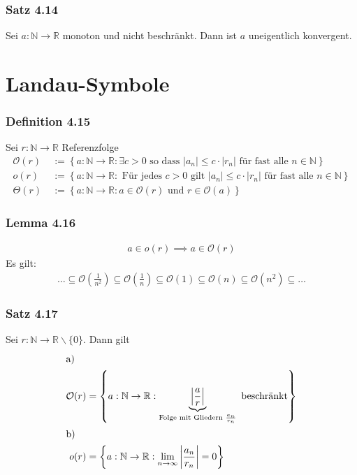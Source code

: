 \documentclass[a5paper, 10pt]{book}
\newcommand{\inN}{\in\mathbb{N}}
\newcommand{\NtoR}{\mathbb{N}\rightarrow\mathbb{R}}
\begin{document}
			\subsubsection{Satz 4.14}
				Sei $a:\NtoR$ monoton und nicht beschränkt. Dann ist $a$ uneigentlich konvergent.
		
		\section{Landau-Symbole}
		
			\subsubsection{Definition 4.15}
				Sei $r: \NtoR$ Referenzfolge
				\begin{align}
					\mathcal{O}(r)&\ := \left\lbrace a:\NtoR: \exists c > 0 \text{ so dass } |a_n| \leq c\cdot |r_n| \text{ für fast alle } n\inN\right\rbrace\\
					o(r)&\ := \left\lbrace a:\NtoR: \text{ Für jedes } c > 0 \text{ gilt } |a_n| \leq c\cdot |r_n| \text{ für fast alle } n\inN\right\rbrace\\
					\Theta(r)&\ := \left\lbrace a:\NtoR: a \in \mathcal{O}(r) \text{ und } r \in \mathcal{O}(a)\right\rbrace
				\end{align}
				
			\subsubsection{Lemma 4.16}
				\begin{align}
					a \in o(r) \implies a \in \mathcal{O}(r)
				\end{align}
				Es gilt:
				\begin{align}
					\dots \subseteq \mathcal{O}\left(\frac{1}{n^2}\right) \subseteq \mathcal{O} \left(\frac{1}{n}\right) \subseteq \mathcal{O}(1) \subseteq \mathcal{O}\left(n\right) \subseteq \mathcal{O} \left(n^2\right) \subseteq \dots
				\end{align}
				
			\subsubsection{Satz 4.17}
				Sei $r: \NtoR\backslash \{0\}$. Dann gilt
				\begin{align}
				\intertext{a)}
					\mathcal{O}(r) &= \left\lbrace a: \NtoR: \underbrace{\left|\frac{a}{r}\right|}_{\text{Folge mit Gliedern } \frac{a_n}{r_n}} \text{ beschränkt} \right\rbrace\\
					\intertext{b)}
					o(r) &= \left\lbrace a: \NtoR : \lim\limits_{n\to\infty}\left|\frac{a_n}{r_n}\right|= 0\right\rbrace
				\end{align}
				
\end{document}
